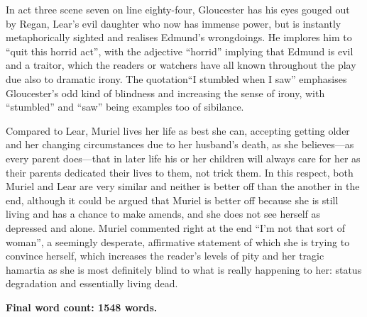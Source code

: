 \documentclass[a4paper]{article}
\begin{document}
In act three scene seven on line eighty-four, Gloucester has his eyes gouged out by Regan, Lear's evil daughter who now has immense power, but is instantly metaphorically sighted and realises Edmund's wrongdoings. He implores him to ``quit this horrid act'', with the adjective ``horrid'' implying that Edmund is evil and a traitor, which the readers or watchers have all known throughout the play due also to dramatic irony. The quotation``I stumbled when I saw'' emphasises Gloucester's odd kind of blindness and increasing the sense of irony, with ``stumbled'' and ``saw'' being examples too of sibilance.

Compared to Lear, Muriel lives her life as best she can, accepting getting older and her changing circumstances due to her husband's death, as she believes---as every parent does---that in later life his or her children will always care for her as their parents dedicated their lives to them, not trick them. In this respect, both Muriel and Lear are very similar and neither is better off than the another in the end, although it could be argued that Muriel is better off because she is still living and has a chance to make amends, and she does not see herself as depressed and alone. Muriel commented right at the end ``I'm not that sort of woman'', a seemingly desperate, affirmative statement of which she is trying to convince herself, which increases the reader's levels of pity and her tragic hamartia as she is most definitely blind to what is really happening to her: status degradation and essentially living dead.

\begin{center}
	\textbf{Final word count: 1548 words.}
\end{center}
\end{document}
